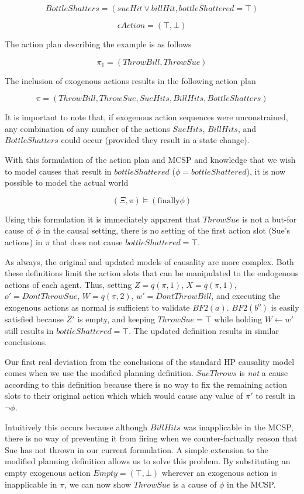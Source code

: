 \documentclass{article}
\theoremstyle{plain}
\theoremstyle{definition}
\begin{document}
\[
BottleShatters = (sueHit \lor billHit, bottleShattered = \top)
\]

\[
\epsilon Action = (\top, \bot)
\]

The action plan describing the example is as follows

\[
\pi_1=(ThrowBill, ThrowSue)
\]

The inclusion of exogenous actions results in the following action plan

\[
\pi = (ThrowBill, ThrowSue, SueHits, BillHits, BottleShatters)
\]

It is important to note that, if exogenous action sequences were unconstrained, any combination of any number of the actions $SueHits$, $BillHits$, and $BottleShatters$ could occur (provided they result in a state change).

With this formulation of the action plan and MCSP and knowledge that we wish to model causes that result in $bottleShattered$ ($\phi=bottleShattered$), it is now possible to model the actual world 

\[
(\Xi, \pi) \models (\textrm{finally} \phi)
\]

Using this formulation it is immediately apparent that $ThrowSue$ is not a but-for cause of $\phi$ in the causal setting, there is no setting of the first action slot (Sue's actions) in $\pi$ that does not cause $bottleShattered=\top$.

As always, the original and updated models of causality are more complex. Both these definitions limit the action slots that can be manipulated to the endogenous actions of each agent. Thus, setting $Z=q(\pi,1)$, $X=q(\pi,1)$, $o'=DontThrowSue$, $W=q(\pi,2)$, $w'=DontThrowBill$, and executing the exogenous actions as normal is sufficient to validate $BF2(a)$. $BF2(b^o)$ is easily satisfied because $Z'$ is empty, and keeping $ThrowSue=\top$ while holding $W\leftarrow w'$ still results in $bottleShattered=\top$. The updated definition results in similar conclusions.

Our first real deviation from the conclusions of the standard HP causality model comes when we use the modified planning definition. $SueThrows$ is \textit{not} a cause according to this definition because there is no way to fix the remaining action slots to their original action which which would cause any value of $\pi'$ to result in $\lnot \phi$.

Intuitively this occurs because although $BillHits$ was inapplicable in the MCSP, there is no way of preventing it from firing when we counter-factually reason that Sue has not thrown in our current formulation. A simple extension to the modified planning definition allows us to solve this problem. By substituting an empty exogenous action $Empty=(\top, \bot)$ wherever an exogenous action is inapplicable in $\pi$, we can now show $ThrowSue$ is a cause of $\phi$ in the MCSP.
\end{document}
